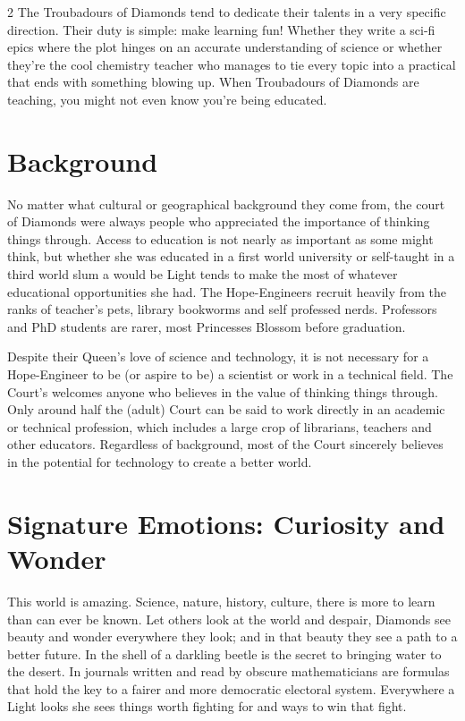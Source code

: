 \begin{multicols}{2}
The Troubadours of Diamonds tend to dedicate their talents in a very specific direction. Their duty is simple: make learning fun! Whether they write a sci-fi epics where the plot hinges on an accurate understanding of science or whether they're the cool chemistry teacher who manages to tie every topic into a practical that ends with something blowing up. When Troubadours of Diamonds are teaching, you might not even know you're being educated.

\section*{Background}

No matter what cultural or geographical background they come from, the court of Diamonds were always people who appreciated the importance of thinking things through. Access to education is not nearly as important as some might think, but whether she was educated in a first world university or self-taught in a third world slum a would be Light tends to make the most of whatever educational opportunities she had. The Hope-Engineers recruit heavily from the ranks of teacher's pets, library bookworms and self professed nerds. Professors and PhD students are rarer, most Princesses Blossom before graduation. 

Despite their Queen's love of science and technology, it is not necessary for a Hope-Engineer to be (or aspire to be) a scientist or work in a technical field. The Court's welcomes anyone who believes in the value of thinking things through. Only around half the (adult) Court can be said to work directly in an academic or technical profession, which includes a large crop of librarians, teachers and other educators. Regardless of background, most of the Court sincerely believes in the potential for technology to create a better world. 

\section*{Signature Emotions: Curiosity and Wonder}

This world is amazing. Science, nature, history, culture, there is more to learn than can ever be known. Let others look at the world and despair, Diamonds see beauty and wonder everywhere they look; and in that beauty they see a path to a better future. In the shell of a darkling beetle is the secret to bringing water to the desert. In journals written and read by obscure mathematicians are formulas that hold the key to a fairer and more democratic electoral system. Everywhere a Light looks she sees things worth fighting for and ways to win that fight. 


\end{multicols}
